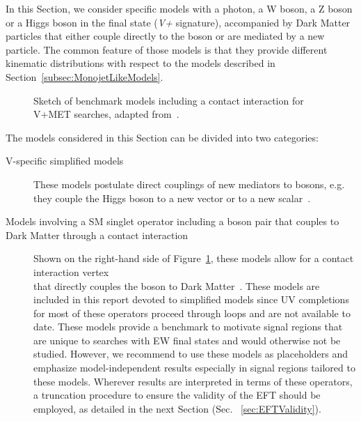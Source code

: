 
In this Section, we consider specific models with a photon, a W boson, a Z boson or a Higgs boson in the final state (\textit{V+\MET} signature), accompanied by Dark Matter particles that either couple directly to the boson or are mediated by a new particle. The common feature of those models is that they provide different kinematic distributions with respect to the models described in Section~\ref{subsec:MonojetLikeModels}.


\begin{figure}[h!]
	\centering
	\vspace{\baselineskip}
	\textwidth

	\begin{feynmandiagram}[modelVeft5pt]
	\end{feynmandiagram}
	
	\vspace{\baselineskip}
	\caption{Sketch of benchmark models including a contact interaction
		for V+MET searches, adapted from~\cite{Nelson:2013pqa}. \label{fig:VPlusMET_EFT}}
\end{figure}

The models considered in this Section can be divided into two categories:
\begin{description}
	\item[V-specific simplified models] These models postulate direct couplings of new mediators
	to bosons, e.g. they couple the Higgs boson to a new vector or to a new scalar~\cite{Carpenter:2013xra,Berlin:2014cfa}. 
	\item[Models involving a SM singlet operator including a boson pair that couples to Dark Matter through a contact interaction]
	Shown on the right-hand side of Figure~\ref{fig:VPlusMET_EFT},
	these models allow for a contact interaction vertex \\that directly couples the boson to Dark Matter~\cite{Cotta:2012nj, Carpenter:2012rg, Crivellin:2015wva,Berlin:2014cfa}.
	These models are included in this report devoted to simplified models since 
	UV completions for most of these operators proceed through loops and are not available to date. 
	These models provide a benchmark to motivate signal regions that are unique to searches with
	EW final states and would otherwise not be studied. However, we recommend to use these models
	as placeholders and emphasize model-independent results especially in signal regions tailored to these models. 
	Wherever results are interpreted in terms of these operators, a truncation procedure
	to ensure the validity of the EFT should be employed, as detailed in the next Section (Sec. ~\ref{sec:EFTValidity}). 
\end{description}


